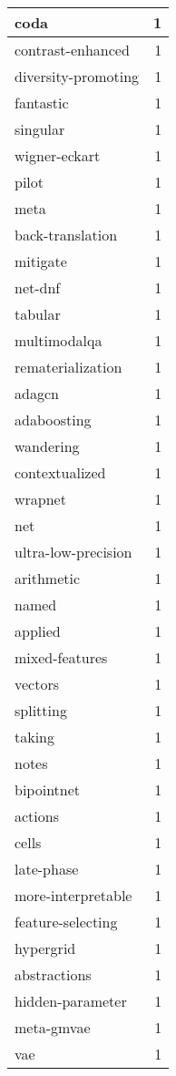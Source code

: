 \begin{table}[h]
\begin{tabular}{|l|r|}
\hline
coda & 1 \\
\hline
contrast-enhanced & 1 \\
\hline
diversity-promoting & 1 \\
\hline
fantastic & 1 \\
\hline
singular & 1 \\
\hline
wigner-eckart & 1 \\
\hline
pilot & 1 \\
\hline
meta & 1 \\
\hline
back-translation & 1 \\
\hline
mitigate & 1 \\
\hline
net-dnf & 1 \\
\hline
tabular & 1 \\
\hline
multimodalqa & 1 \\
\hline
rematerialization & 1 \\
\hline
adagcn & 1 \\
\hline
adaboosting & 1 \\
\hline
wandering & 1 \\
\hline
contextualized & 1 \\
\hline
wrapnet & 1 \\
\hline
net & 1 \\
\hline
ultra-low-precision & 1 \\
\hline
arithmetic & 1 \\
\hline
named & 1 \\
\hline
applied & 1 \\
\hline
mixed-features & 1 \\
\hline
vectors & 1 \\
\hline
splitting & 1 \\
\hline
taking & 1 \\
\hline
notes & 1 \\
\hline
bipointnet & 1 \\
\hline
actions & 1 \\
\hline
cells & 1 \\
\hline
late-phase & 1 \\
\hline
more-interpretable & 1 \\
\hline
feature-selecting & 1 \\
\hline
hypergrid & 1 \\
\hline
abstractions & 1 \\
\hline
hidden-parameter & 1 \\
\hline
meta-gmvae & 1 \\
\hline
vae & 1 \\
\hline

\end{tabular}
\end{table}
